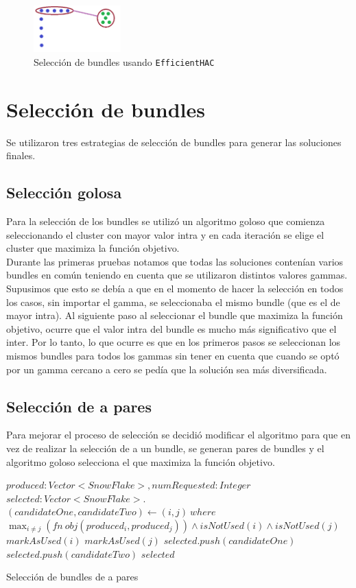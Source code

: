 \begin{figure}[H]
  \centering
    \includegraphics[width=0.3\textwidth]{img/cluster2.png}
  \caption{Selección de bundles usando \texttt{EfficientHAC}}
  \label{res:img-usingEfficientHAC}
\end{figure}

\section{Selección de bundles}
Se utilizaron tres estrategias de selección de bundles para generar las soluciones finales.
\subsection{Selección golosa}
Para la selección de los bundles se utilizó un algoritmo goloso que comienza seleccionando el 
cluster con mayor valor intra y en cada iteración se elige el cluster que maximiza la función 
objetivo.\\
Durante las primeras pruebas notamos que todas las soluciones contenían varios bundles en común 
teniendo en cuenta que se utilizaron distintos valores gammas. Supusimos que esto se debía a que en 
el momento de hacer la selección en todos los casos, sin importar el gamma, se seleccionaba el mismo 
bundle (que es el de mayor intra). Al siguiente paso al seleccionar el bundle que maximiza la 
función objetivo, ocurre que el valor intra del bundle es mucho más significativo que el inter. Por 
lo tanto, lo que ocurre es que en los primeros pasos se seleccionan los mismos bundles para todos 
los gammas sin tener en cuenta que cuando se optó por un gamma cercano a cero se pedía que la 
solución sea más diversificada.\\
\subsection{Selección de a pares}
Para mejorar el proceso de selección se decidió modificar el algoritmo para que en vez de realizar 
la selección de a un bundle, se generan pares de bundles y el algoritmo goloso selecciona el que 
maximiza la función objetivo.
\begin{algorithm}[H]
\begin{algorithmic}[1]
\REQUIRE $produced:Vector<SnowFlake>, numRequested:Integer$
\ENSURE $selected:Vector<SnowFlake>$.
\STATE $(candidateOne, candidateTwo) \leftarrow (i, j)\ where$ \\ 
$\displaystyle\max_{i \neq j} (fn\ obj(produced_{i},produced_{j})) \wedge isNotUsed(i) \wedge 
isNotUsed(j)$
\STATE $markAsUsed(i)$
\STATE $markAsUsed(j)$
\STATE $selected.push(candidateOne)$
\STATE $selected.push(candidateTwo)$
\ENDWHILE
\RETURN $selected$
\end{algorithmic}
\caption{Selección de bundles de a pares}\label{alg:algSelTuple}
\end{algorithm}
